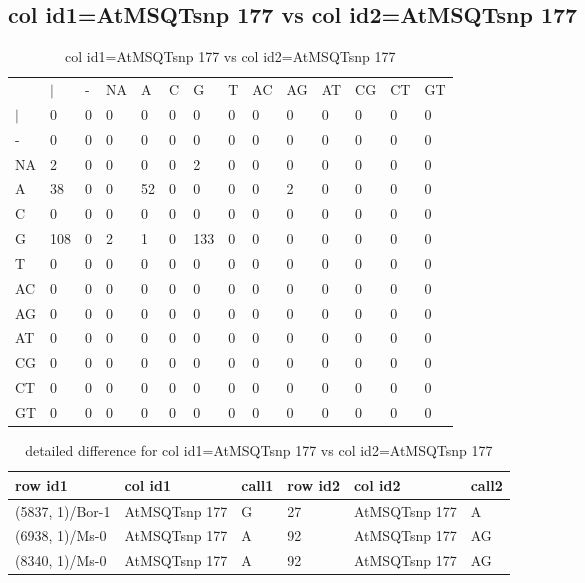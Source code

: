 \subsection{col id1=AtMSQTsnp 177 vs col id2=AtMSQTsnp 177}
\begin{center}
\begin{longtable}{|l|l|l|l|l|l|l|l|l|l|l|l|l|l|}
\caption{col id1=AtMSQTsnp 177 vs col id2=AtMSQTsnp 177} \label{table_dm744}\\
\hline
\\
\hline
&$|$&-&NA&A&C&G&T&AC&AG&AT&CG&CT&GT\\
$|$&0&0&0&0&0&0&0&0&0&0&0&0&0\\
-&0&0&0&0&0&0&0&0&0&0&0&0&0\\
NA&2&0&0&0&0&2&0&0&0&0&0&0&0\\
A&38&0&0&52&0&0&0&0&2&0&0&0&0\\
C&0&0&0&0&0&0&0&0&0&0&0&0&0\\
G&108&0&2&1&0&133&0&0&0&0&0&0&0\\
T&0&0&0&0&0&0&0&0&0&0&0&0&0\\
AC&0&0&0&0&0&0&0&0&0&0&0&0&0\\
AG&0&0&0&0&0&0&0&0&0&0&0&0&0\\
AT&0&0&0&0&0&0&0&0&0&0&0&0&0\\
CG&0&0&0&0&0&0&0&0&0&0&0&0&0\\
CT&0&0&0&0&0&0&0&0&0&0&0&0&0\\
GT&0&0&0&0&0&0&0&0&0&0&0&0&0\\
\hline
\end{longtable}
\end{center}

\begin{center}
\begin{longtable}{|l|l|l|l|l|l|}
\caption{detailed difference for col id1=AtMSQTsnp 177 vs col id2=AtMSQTsnp 177} \label{table_dm745}\\
\hline
row id1&col id1&call1&row id2&col id2&call2\\
\hline
(5837, 1)/Bor-1&AtMSQTsnp 177&G&27&AtMSQTsnp 177&A\\
(6938, 1)/Ms-0&AtMSQTsnp 177&A&92&AtMSQTsnp 177&AG\\
(8340, 1)/Ms-0&AtMSQTsnp 177&A&92&AtMSQTsnp 177&AG\\
\hline
\end{longtable}
\end{center}

